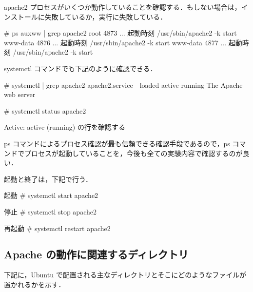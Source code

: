 apache2 プロセスがいくつか動作していることを確認する．もしない場合は，インストールに失敗しているか，実行に失敗している．

\begin{cli}
# ps auxww | grep apache2
root      4873  ...  起動時刻 /usr/sbin/apache2 -k start
www-data  4876  ...  起動時刻 /usr/sbin/apache2 -k start
www-data  4877  ...  起動時刻 /usr/sbin/apache2 -k start
\end{cli}

systemctl コマンドでも下記のように確認できる．

\begin{cli}
# systemctl | grep apache2
apache2.service　loaded active running  The Apache web server

# systemctl status apache2

Active: active (running) の行を確認する
\end{cli}

ps コマンドによるプロセス確認が最も信頼できる確認手段であるので，ps コマンドでプロセスが起動していることを，今後も全ての実験内容で確認するのが良い．

起動と終了は，下記で行う．

\begin{cli}
起動
# systemctl start apache2

停止
# systemctl stop apache2

再起動
# systemctl restart apache2
\end{cli}

\subsection{Apache の動作に関連するディレクトリ}

下記に，Ubuntu で配置される主なディレクトリとそこにどのようなファイルが置かれるかを示す．

